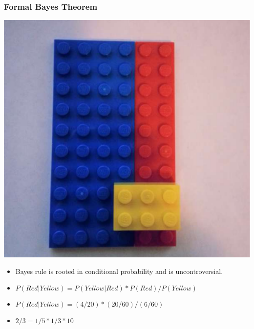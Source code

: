 \documentclass[hyperref={pdfpagelabels=false},unknownkeysallowed]{beamer}
\begin{document}
\begin{frame}
\frametitle{Formal Bayes Theorem}
\begin{center}
\includegraphics[scale=0.2]{lego.pdf} 
\end{center}
\begin{itemize}
\item Bayes rule is rooted in conditional probability and is uncontroversial.

\item $P(Red|Yellow) = P(Yellow|Red) * P(Red) / P(Yellow)$

\item $P(Red|Yellow) = (4/20) * (20/60) / (6/60)$

\item $2 / 3 = 1/5 * 1/3 * 10$
\end{itemize} 
\end{frame}
\end{document}
